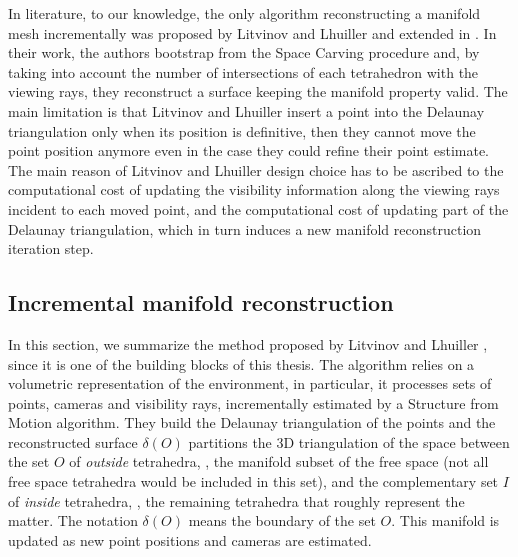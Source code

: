 In literature, to our knowledge, the only algorithm reconstructing a manifold mesh incrementally was proposed by Litvinov and Lhuiller \cite{litvinov_lhuillier_13,litvinov_Lhiuller14} and extended in \cite{romanoni15a,romanoni15b}. 
In their work, the authors  bootstrap from the Space Carving procedure and, by taking into account the number of intersections of each tetrahedron with the viewing rays, they reconstruct a surface keeping the manifold property valid. 
The main limitation is that  Litvinov and Lhuiller insert a point into the Delaunay triangulation only when its position is definitive, then they cannot move the point position anymore even in the case they could refine their point  estimate. 
The main reason of Litvinov and Lhuiller design choice has to be ascribed to the computational cost of updating the visibility information along the viewing rays incident to each moved point, and the computational cost of updating part of the Delaunay triangulation, which in turn induces a new manifold reconstruction iteration step.

\subsection{Incremental manifold reconstruction}
\label{subsec:incrementalManifold_2}
In this section, we summarize the method proposed  by Litvinov and Lhuiller \cite{litvinov_lhuillier_13,litvinov_Lhiuller14}, since it is one of the building blocks of this thesis.
The algorithm relies on a volumetric representation of the environment, in particular, it processes sets of points, cameras and visibility rays,  incrementally estimated by a Structure from Motion algorithm. 
They build the Delaunay triangulation of the points and the reconstructed surface $\delta( O)$ partitions  the 3D triangulation of the space between the set $O$ of \emph{outside} tetrahedra, \ie, the manifold subset of the free space (not all free space tetrahedra would be included in this set), and the complementary set $I$ of \emph{inside} tetrahedra, \ie, the remaining tetrahedra that roughly represent the matter. The notation $\delta( O)$ means the boundary  of the set $O$.
This manifold is updated as new point positions and cameras are estimated. 

